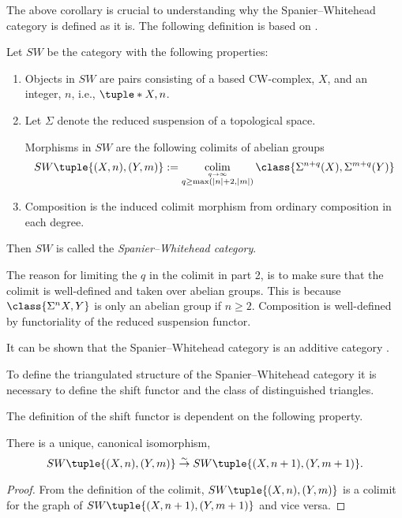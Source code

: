 The above corollary is crucial to understanding why the Spanier--Whitehead category is defined as it is. The following definition is based on \cite[Definition 2]{Schwede_2010}.

\begin{definition}
    \label{def:sw-cat}
    Let \( SW \) be the category with the following properties:
    \begin{enumerate}
        \item {
            Objects in \( SW \) are pairs consisting of a based CW-complex, \( X \), and an integer, \( n \), i.e., \( \tuple*{X, n} \).
        }
        \item {
            Let \( \Sigma \) denote the reduced suspension of a topological space.

            Morphisms in \( SW \) are the following colimits of abelian groups
            \[
                SW\tuple{ (X, n), (Y, m) } := \colim_{\stackrel{q \to \infty}{q \geq \max(|n| + 2, |m|)}} \class{ \Sigma^{n + q}(X), \Sigma^{m + q}(Y) }
            \]
        }
        \item {
            Composition is the induced colimit morphism from ordinary composition in each degree.
        }
    \end{enumerate}

    Then \( SW \) is called the \emph{Spanier--Whitehead category}.
\end{definition}

The reason for limiting the \( q \) in the colimit in part 2, is to make sure that the colimit is well-defined and taken over abelian groups. This is because \( \class{\Sigma^n X, Y} \) is only an abelian group if \( n \geq 2 \). Composition is well-defined by functoriality of the reduced suspension functor.

It can be shown that the Spanier--Whitehead category is an additive category \cite[Proposition 5.7]{Daria_Bachelor}.

To define the triangulated structure of the Spanier--Whitehead category it is necessary to define the shift functor and the class of distinguished triangles.

The definition of the shift functor is dependent on the following property.
\begin{lemma}
    \label{lem:sw_colim_canonical_iso}
    There is a unique, canonical isomorphism,
    \[
        SW\tuple{ (X, n), (Y, m) } \stackrel{\sim}{\to} SW\tuple{ (X, n + 1), (Y, m + 1) }.
    \]
\end{lemma}
\begin{proof}
    From the definition of the colimit, \( SW\tuple{ (X, n), (Y, m) } \) is a colimit for the graph of \( SW\tuple{ (X, n + 1), (Y, m + 1) } \) and vice versa.
\end{proof}


